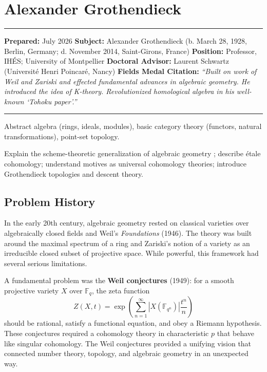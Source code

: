 \chapter{Alexander Grothendieck}\label{ch1966alexandergrothendieck:alexander-grothendieck-fields-medal-1966-a-comprehensive-report}

\begin{center}\rule{0.5\linewidth}{0.5pt}\end{center}

\textbf{Prepared:} July 2026
\textbf{Subject:} Alexander Grothendieck (b. March 28, 1928, Berlin, Germany; d. November 2014, Saint-Girons, France)
\textbf{Position:} Professor, IHÉS; University of Montpellier
\textbf{Doctoral Advisor:} Laurent Schwartz (Université Henri Poincaré, Nancy)
\textbf{Fields Medal Citation:} \emph{``Built on work of Weil and Zariski and
effected fundamental advances in algebraic geometry. He introduced the idea of
K-theory. Revolutionized homological algebra in his well-known `Tohoku paper'.''}

\begin{center}\rule{0.5\linewidth}{0.5pt}\end{center}

\begin{prereqs} Abstract algebra (rings, ideals, modules), basic category theory
(functors, natural transformations), point-set topology.
\end{prereqs}

\begin{objectives} Explain the scheme-theoretic generalization of algebraic
geometry \cite{grothendieck1960}; describe étale cohomology; understand motives as universal cohomology
theories; introduce Grothendieck topologies and descent theory.
\end{objectives}

\section{Problem History}

In the early 20th century, algebraic geometry rested on classical varieties over
algebraically closed fields and Weil's \emph{Foundations} (1946). The theory was
built around the maximal spectrum of a ring and Zariski's notion of a variety as
an irreducible closed subset of projective space. While powerful, this framework
had several serious limitations.

A fundamental problem was the \textbf{Weil conjectures} (1949): for a smooth
projective variety $X$ over $\mathbb{F}_q$, the zeta function
\[
Z(X, t) = \exp\left(\sum_{n=1}^{\infty} |X(\mathbb{F}_{q^n})| \frac{t^n}{n}\right)
\]
should be rational, satisfy a functional equation, and obey a Riemann hypothesis.
These conjectures required a cohomology theory in characteristic $p$ that
behave like singular cohomology. The Weil conjectures provided a unifying vision
that connected number theory, topology, and algebraic geometry in an
unexpected way.

